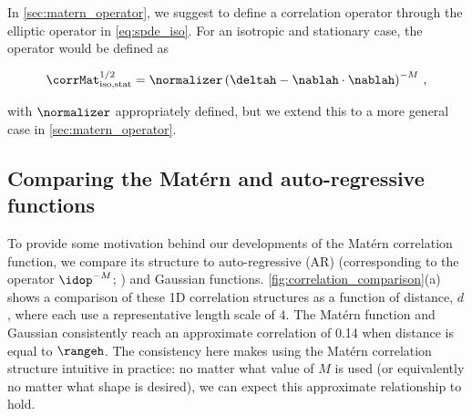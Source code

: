 \documentclass[alpha-refs]{wiley-article}
\begin{document}

In \cref{sec:matern_operator}, we suggest to define a correlation operator through the
elliptic operator in \cref{eq:spde_iso}.
For an isotropic and stationary case, the operator would be defined as
\begin{linenomath*}\begin{equation}
    \corrMat^{1/2}_\text{iso,stat} = \normalizer \left(\deltah -
    \nablah\cdot\nablah\right)^{-M} \, ,
    \label{eq:matern_corr_isostat}
\end{equation}\end{linenomath*}
with $\normalizer$ appropriately defined, but we extend this to a more general
case in \cref{sec:matern_operator}.


\subsection{Comparing the Mat\'ern and auto-regressive functions}
\label{ssec:correlation_comparison}

To provide some motivation behind our developments of the Mat\'ern
correlation function, we compare its structure to auto-regressive (AR)
(corresponding to the operator $\idop^{-M}$; \citep{mirouze_representation_2010})
and Gaussian functions.
\cref{fig:correlation_comparison}(a) shows a comparison of these 1D correlation
structures as a function of distance, $d$, where each use a representative length
scale of $4$.
The Mat\'ern function and Gaussian consistently reach an approximate correlation
of 0.14 when distance is equal to $\rangeh$.
The consistency here makes using the Mat\'ern correlation structure intuitive in
practice: no matter what value of $M$ is used (or equivalently no matter what
shape is desired), we can expect this approximate relationship to hold.
\end{document}
